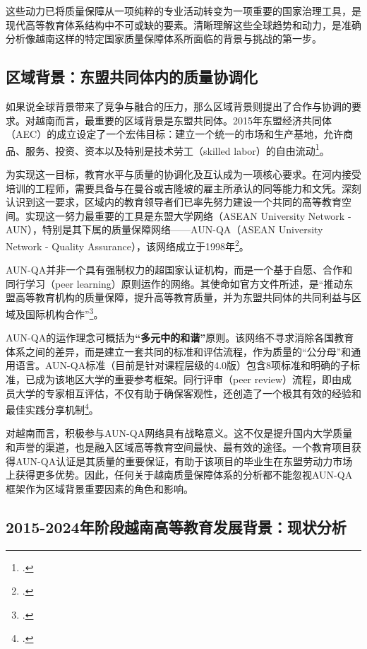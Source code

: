 这些动力已将质量保障从一项纯粹的专业活动转变为一项重要的国家治理工具，是现代高等教育体系结构中不可或缺的要素。清晰理解这些全球趋势和动力，是准确分析像越南这样的特定国家质量保障体系所面临的背景与挑战的第一步。

\subsection{区域背景：东盟共同体内的质量协调化}
\label{subsec:boi_canh_khu_vuc}

如果说全球背景带来了竞争与融合的压力，那么区域背景则提出了合作与协调的要求。对越南而言，最重要的区域背景是东盟共同体。2015年东盟经济共同体（AEC）的成立设定了一个宏伟目标：建立一个统一的市场和生产基地，允许商品、服务、投资、资本以及特别是技术劳工（skilled labor）的自由流动\footcite{ASEAN_AEC_Blueprint}。

为实现这一目标，教育水平与质量的协调化及互认成为一项核心要求。在河内接受培训的工程师，需要具备与在曼谷或吉隆坡的雇主所承认的同等能力和文凭。深刻认识到这一要求，区域内的教育领导者们已率先努力建设一个共同的高等教育空间。实现这一努力最重要的工具是东盟大学网络（ASEAN University Network - AUN），特别是其下属的质量保障网络——AUN-QA（ASEAN University Network - Quality Assurance），该网络成立于1998年\footcite{AUNQA_History}。

AUN-QA并非一个具有强制权力的超国家认证机构，而是一个基于自愿、合作和同行学习（peer learning）原则运作的网络。其使命如官方文件所述，是“推动东盟高等教育机构的质量保障，提升高等教育质量，并为东盟共同体的共同利益与区域及国际机构合作”\footcite{AUN-QAGuide}。

AUN-QA的运作理念可概括为\textbf{“多元中的和谐”}原则。该网络不寻求消除各国教育体系之间的差异，而是建立一套共同的标准和评估流程，作为质量的“公分母”和通用语言。AUN-QA标准（目前是针对课程层级的4.0版）包含8项标准和明确的子标准，已成为该地区大学的重要参考框架。同行评审（peer review）流程，即由成员大学的专家相互评估，不仅有助于确保客观性，还创造了一个极其有效的经验和最佳实践分享机制\footcite{AUNQA_Report2023}。

对越南而言，积极参与AUN-QA网络具有战略意义。这不仅是提升国内大学质量和声誉的渠道，也是融入区域高等教育空间最快、最有效的途径。一个教育项目获得AUN-QA认证是其质量的重要保证，有助于该项目的毕业生在东盟劳动力市场上获得更多优势。因此，任何关于越南质量保障体系的分析都不能忽视AUN-QA框架作为区域背景重要因素的角色和影响。


\subsection{2015-2024年阶段越南高等教育发展背景：现状分析}


